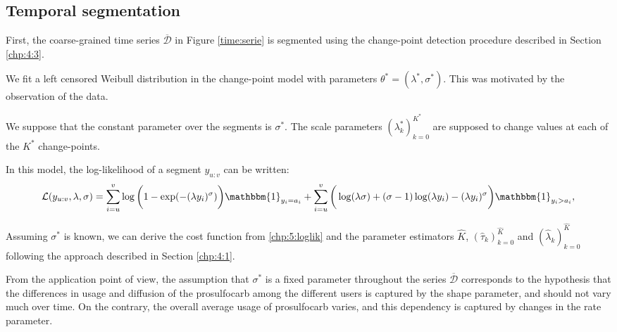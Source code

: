 \subsection{Temporal segmentation}\label{sec:time_pattern}

First, the coarse-grained time series $\overline{\mathcal{D}}$ in Figure \ref{time:serie} is segmented using the change-point detection procedure described in Section \ref{chp:4:3}. 

We fit a left censored Weibull distribution in the change-point model with parameters $\theta^* = (\lambda^*,\sigma^*)$. This was motivated by the observation of the data. 

We suppose that the constant parameter over the segments is $\sigma^*$. The scale parameters $(\lambda^*_k)_{k = 0}^{K^*}$ are supposed to change values at each of the $K^*$ change-points.    

In this model, the log-likelihood of a segment $y_{u:v}$ can be written:
\begin{equation}\label{chp:5:loglik}
\mathcal{L}(y_{u:v},\lambda,\sigma) = \sum_{i=u}^v\log\bigg(1-\exp(-(\lambda y_i)^\sigma)\bigg)\mathbbm{1}_{y_i=a_i}+\sum_{i=u}^v\bigg(\log(\lambda\sigma)+(\sigma-1)\log(\lambda y_i)-(\lambda y_i)^\sigma\bigg)\mathbbm{1}_{y_i>a_i},
\end{equation}

Assuming $\sigma^*$ is known, we can derive the cost function from \eqref{chp:5:loglik} and the parameter estimators $\widehat{K}$, $(\widehat{\tau}_k)_{k = 0}^{\widehat{K}}$ and $(\widehat{\lambda}_k)_{k = 0}^{\widehat{K}}$  following the approach described in Section \ref{chp:4:1}.

From the application point of view, the assumption that $\sigma^*$ is a fixed parameter throughout the series $\overline{\mathcal{D}}$ corresponds to the hypothesis that the differences in usage and diffusion of the prosulfocarb among the different users is captured by the shape parameter, and should not vary much over time. On the contrary, the overall average usage of prosulfocarb varies, and this dependency is captured by changes in the rate parameter. 


